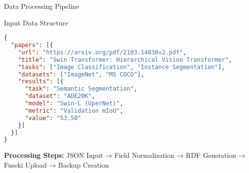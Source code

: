 \documentclass[aspectratio=169]{beamer}
\begin{document}
\begin{frame}[fragile]{Data Processing Pipeline}
    \begin{block}{Input Data Structure}
        \begin{lstlisting}[language=json]
{
  "papers": [{
    "url": "https://arxiv.org/pdf/2103.14030v2.pdf",
    "title": "Swin Transformer: Hierarchical Vision Transformer",
    "tasks": ["Image Classification", "Instance Segmentation"],
    "datasets": ["ImageNet", "MS COCO"],
    "results": [{
      "task": "Semantic Segmentation",
      "dataset": "ADE20K",
      "model": "Swin-L (UperNet)",
      "metric": "Validation mIoU",
      "value": "53.50"
    }]
  }]
}
        \end{lstlisting}
    \end{block}
    
    \textbf{Processing Steps:} JSON Input → Field Normalization → RDF Generation → Fuseki Upload → Backup Creation
\end{frame}
\end{document}
